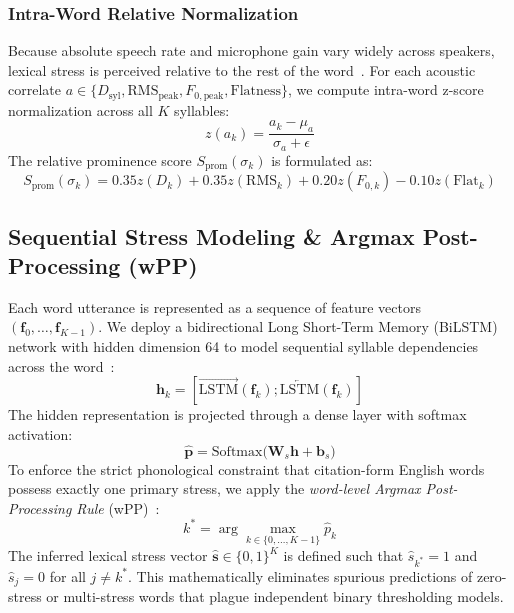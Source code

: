\documentclass[10pt,conference]{IEEEtran}
\begin{document}
\subsubsection{Intra-Word Relative Normalization}
Because absolute speech rate and microphone gain vary widely across speakers, lexical stress is perceived relative to the rest of the word~\cite{fry1958experiments}. For each acoustic correlate $a \in \{D_{\text{syl}}, \text{RMS}_{\text{peak}}, F_{0,\text{peak}}, \text{Flatness}\}$, we compute intra-word z-score normalization across all $K$ syllables:
\begin{equation}
z(a_k) = \frac{a_k - \mu_a}{\sigma_a + \epsilon}
\end{equation}
The relative prominence score $S_{\text{prom}}(\sigma_k)$ is formulated as:
\begin{equation}
S_{\text{prom}}(\sigma_k) = 0.35 z(D_k) + 0.35 z(\text{RMS}_k) + 0.20 z(F_{0,k}) - 0.10 z(\text{Flat}_k)
\label{eq:prominence_score}
\end{equation}

\subsection{Sequential Stress Modeling \& Argmax Post-Processing (wPP)}
\label{sec:stress_seq}
Each word utterance is represented as a sequence of feature vectors $(\mathbf{f}_0, \dots, \mathbf{f}_{K-1})$. We deploy a bidirectional Long Short-Term Memory (BiLSTM) network with hidden dimension 64 to model sequential syllable dependencies across the word~\cite{mallela2024comparative}:
\begin{equation}
\mathbf{h}_k = [\overrightarrow{\text{LSTM}}(\mathbf{f}_k); \overleftarrow{\text{LSTM}}(\mathbf{f}_k)]
\end{equation}
The hidden representation is projected through a dense layer with softmax activation:
\begin{equation}
\hat{\mathbf{p}} = \text{Softmax}\big(\mathbf{W}_s \mathbf{h} + \mathbf{b}_s\big)
\end{equation}
To enforce the strict phonological constraint that citation-form English words possess exactly one primary stress, we apply the \textit{word-level Argmax Post-Processing Rule} (wPP)~\cite{mallela2024comparative}:
\begin{equation}
k^* = \arg\max_{k \in \{0, \dots, K-1\}} \hat{p}_k
\label{eq:argmax_wpp}
\end{equation}
The inferred lexical stress vector $\hat{\mathbf{s}} \in \{0, 1\}^K$ is defined such that $\hat{s}_{k^*} = 1$ and $\hat{s}_{j} = 0$ for all $j \neq k^*$. This mathematically eliminates spurious predictions of zero-stress or multi-stress words that plague independent binary thresholding models.
\end{document}
